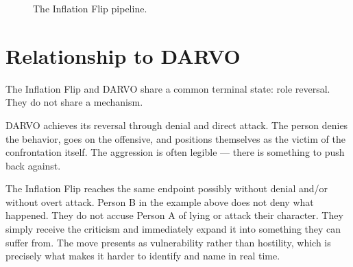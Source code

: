 \begin{figure}[htbp]
  \centering
  \caption{The Inflation Flip pipeline.}
  \label{fig:inflation-flip}
\end{figure}

\section{Relationship to DARVO}

The Inflation Flip and DARVO share a common terminal state: role reversal.
They do not share a mechanism.

DARVO achieves its reversal through denial and direct attack.
The person denies the behavior, goes on the offensive, and positions themselves as the victim of the confrontation itself.
The aggression is often legible --- there is something to push back against.

The Inflation Flip reaches the same endpoint possibly without denial and/or without overt attack.
Person B in the example above does not deny what happened.
They do not accuse Person A of lying or attack their character.
They simply receive the criticism and immediately expand it into something they can suffer from.
The move presents as vulnerability rather than hostility, which is precisely what makes it harder to identify and name in real time.

